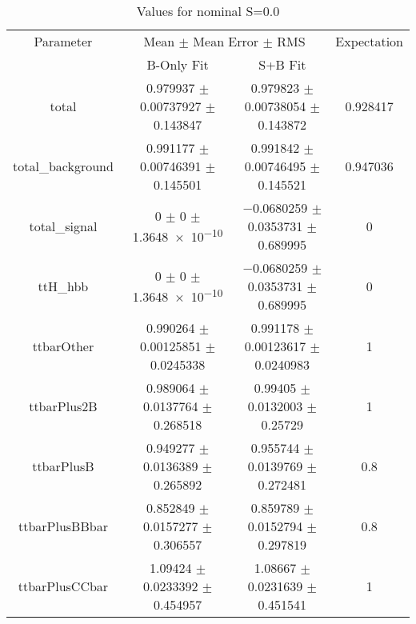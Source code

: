 \begin{table}
\centering
\caption{Values for nominal S=0.0}
\begin{tabular}{cccc}
\toprule
Parameter & \multicolumn{2}{c}{Mean $\pm$ Mean Error $\pm$ RMS} & Expectation\\
 & B-Only Fit & S+B Fit & \\
\midrule
total & \num{0.979937} $\pm$ \num{0.00737927} $\pm$ \num{0.143847} & \num{0.979823} $\pm$ \num{0.00738054} $\pm$ \num{0.143872} & \num{0.928417}\\
total\_background & \num{0.991177} $\pm$ \num{0.00746391} $\pm$ \num{0.145501} & \num{0.991842} $\pm$ \num{0.00746495} $\pm$ \num{0.145521} & \num{0.947036}\\
total\_signal & \num{0} $\pm$ \num{0} $\pm$ \num{1.3648e-10} & \num{-0.0680259} $\pm$ \num{0.0353731} $\pm$ \num{0.689995} & \num{0}\\
ttH\_hbb & \num{0} $\pm$ \num{0} $\pm$ \num{1.3648e-10} & \num{-0.0680259} $\pm$ \num{0.0353731} $\pm$ \num{0.689995} & \num{0}\\
ttbarOther & \num{0.990264} $\pm$ \num{0.00125851} $\pm$ \num{0.0245338} & \num{0.991178} $\pm$ \num{0.00123617} $\pm$ \num{0.0240983} & \num{1}\\
ttbarPlus2B & \num{0.989064} $\pm$ \num{0.0137764} $\pm$ \num{0.268518} & \num{0.99405} $\pm$ \num{0.0132003} $\pm$ \num{0.25729} & \num{1}\\
ttbarPlusB & \num{0.949277} $\pm$ \num{0.0136389} $\pm$ \num{0.265892} & \num{0.955744} $\pm$ \num{0.0139769} $\pm$ \num{0.272481} & \num{0.8}\\
ttbarPlusBBbar & \num{0.852849} $\pm$ \num{0.0157277} $\pm$ \num{0.306557} & \num{0.859789} $\pm$ \num{0.0152794} $\pm$ \num{0.297819} & \num{0.8}\\
ttbarPlusCCbar & \num{1.09424} $\pm$ \num{0.0233392} $\pm$ \num{0.454957} & \num{1.08667} $\pm$ \num{0.0231639} $\pm$ \num{0.451541} & \num{1}\\
\bottomrule
\end{tabular}
\end{table}